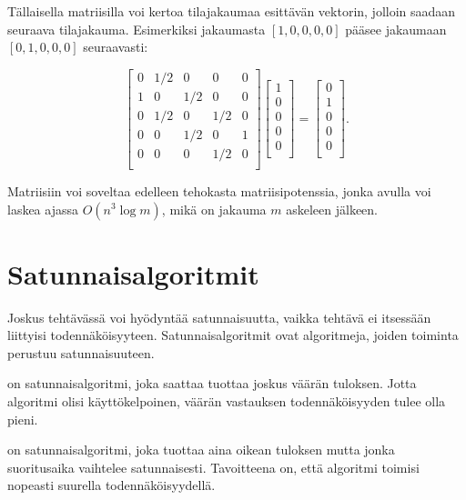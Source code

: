 Tällaisella matriisilla voi kertoa tilajakaumaa esittävän
vektorin, jolloin saadaan seuraava tilajakauma.
Esimerkiksi jakaumasta $[1,0,0,0,0]$ pääsee jakaumaan
$[0,1,0,0,0]$ seuraavasti:

\[ 
 \begin{bmatrix}
  0 & 1/2 & 0 & 0 & 0 \\
  1 & 0 & 1/2 & 0 & 0 \\
  0 & 1/2 & 0 & 1/2 & 0 \\
  0 & 0 & 1/2 & 0 & 1 \\
  0 & 0 & 0 & 1/2 & 0 \\
 \end{bmatrix}
 \begin{bmatrix}
  1 \\
  0 \\
  0 \\
  0 \\
  0 \\
 \end{bmatrix}
=
 \begin{bmatrix}
  0 \\
  1 \\
  0 \\
  0 \\
  0 \\
 \end{bmatrix}.
\]

Matriisiin voi soveltaa edelleen tehokasta
matriisipotenssia, jonka avulla voi laskea
ajassa $O(n^3 \log m)$,
mikä on jakauma $m$ askeleen jälkeen.

\section{Satunnaisalgoritmit}


Joskus tehtävässä voi hyödyntää satunnaisuutta,
vaikka tehtävä ei itsessään liittyisi todennäköisyyteen.
Satunnaisalgoritmit ovat algoritmeja, joiden toiminta
perustuu satunnaisuuteen.


 on satunnaisalgoritmi,
joka saattaa tuottaa joskus väärän tuloksen.
Jotta algoritmi olisi käyttökelpoinen,
väärän vastauksen todennäköisyyden tulee olla pieni.


 on satunnaisalgoritmi,
joka tuottaa aina oikean tuloksen mutta jonka
suoritusaika vaihtelee satunnaisesti.
Tavoitteena on, että algoritmi toimisi nopeasti
suurella todennäköisyydellä.

